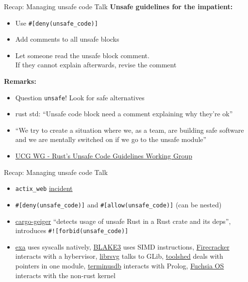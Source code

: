 \documentclass{beamer}
\begin{document}
\begin{frame}[fragile]{Recap: Managing unsafe code Talk}
  \textbf{Unsafe guidelines for the impatient:}
  \begin{itemize}
    \item Use \texttt{#[deny(unsafe_code)]}
    \item Add comments to all unsafe blocks
    \item Let someone read the unsafe block comment. \\
          If they cannot explain afterwards, revise the comment
  \end{itemize}

  \textbf{Remarks:}
  \begin{itemize}
    \item Question \texttt{unsafe}! Look for safe alternatives
    \item rust std: \enquote{Unsafe code block need a comment explaining why they're ok}
    \item \enquote{We try to create a situation where we, as a team, are building safe software and we are mentally switched on if we go to the unsafe module}
    \item \href{https://github.com/rust-lang/unsafe-code-guidelines}{UCG WG - Rust's Unsafe Code Guidelines Working Group}
  \end{itemize}
\end{frame}

\begin{frame}[fragile]{Recap: Managing unsafe code Talk}
  \begin{itemize}
    \item \texttt{actix\_web} \href{https://github.com/rust-user-group-graz/07-unsafe}{incident}
    \item \texttt{#[deny(unsafe_code)]} and \texttt{#[allow(unsafe_code)]} (can be nested)
    \item \href{https://crates.io/crates/cargo-geiger}{cargo-geiger} \enquote{detects usage of unsafe Rust in a Rust crate and its deps}, introduces \texttt{#![forbid(unsafe_code)]}
    \item \href{https://crates.io/crates/exa}{exa} uses syscalls natively, \href{https://crates.io/crates/blake3}{BLAKE3} uses SIMD instructions, \href{https://crates.io/crates/firecracker}{Firecracker} interacts with a hybervisor, \href{https://gitlab.gnome.org/GNOME/librsvg}{librsvg} talks to GLib, \href{https://crates.io/crates/toolshed}{toolshed} deals with pointers in one module, \href{https://terminusdb.com/}{terminusdb} interacts with Prolog, \href{https://fuchsia.dev/}{Fuchsia OS} interacts with the non-rust kernel
  \end{itemize}
\end{frame}
\end{document}
